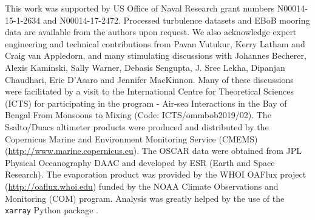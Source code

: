 \documentclass[onecol]{ametsoc}
\begin{document}
This work was supported by US Office of Naval Research grant numbers N00014-15-1-2634 and N00014-17-2472.
Processed turbulence datasets and EBoB mooring data are available from the authors upon request.
We also acknowledge expert engineering and technical contributions from Pavan Vutukur, Kerry Latham and Craig van Appledorn, and many stimulating discussions with Johannes Becherer, Alexis Kaminski, Sally Warner, Debasis Sengupta, J. Sree Lekha, Dipanjan Chaudhari, Eric D'Asaro and Jennifer MacKinnon.
Many of these discussions were facilitated by a visit to the International Centre for Theoretical Sciences (ICTS) for participating in the program - Air-sea Interactions in the Bay of Bengal From Monsoons to Mixing (Code: ICTS/ommbob2019/02).
The Ssalto/Duacs altimeter products were produced and distributed by the Copernicus Marine and Environment Monitoring Service (CMEMS) (\url{http://www.marine.copernicus.eu}).
The OSCAR data were obtained from JPL Physical Oceanography DAAC and developed by ESR (Earth and Space Research).
The evaporation product was provided by the WHOI OAFlux project (\url{http://oaflux.whoi.edu}) funded by the NOAA Climate Observations and Monitoring (COM) program.
Analysis was greatly helped by the use of the \texttt{xarray} Python package \citep{Hoyer2017}.
\end{document}
